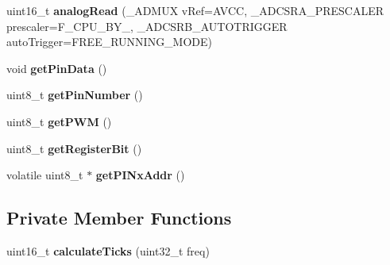 \begin{DoxyCompactItemize}
uint16\+\_\+t {\bfseries analog\+Read} (\+\_\+\+A\+D\+M\+UX v\+Ref=A\+V\+CC, \+\_\+\+A\+D\+C\+S\+R\+A\+\_\+\+P\+R\+E\+S\+C\+A\+L\+ER prescaler=F\+\_\+\+C\+P\+U\+\_\+\+B\+Y\+\_, \+\_\+\+A\+D\+C\+S\+R\+B\+\_\+\+A\+U\+T\+O\+T\+R\+I\+G\+G\+ER auto\+Trigger=F\+R\+E\+E\+\_\+\+R\+U\+N\+N\+I\+N\+G\+\_\+\+M\+O\+DE)
\item 
\mbox{\label{classPin_aa81249603376710b26f6e803db46658e}} 
void {\bfseries get\+Pin\+Data} ()
\item 
\mbox{\label{classPin_aaad2c2cc8ccda03ffe9c07e12323cf4d}} 
uint8\+\_\+t {\bfseries get\+Pin\+Number} ()
\item 
\mbox{\label{classPin_a5a9c1d0f1937b7083779ca4afba2a607}} 
uint8\+\_\+t {\bfseries get\+P\+WM} ()
\item 
\mbox{\label{classPin_af7d88df8c24769198ee8e022ce0ed0fd}} 
uint8\+\_\+t {\bfseries get\+Register\+Bit} ()
\item 
\mbox{\label{classPin_ae2d4f832b081cd2d188151a0c4589f8d}} 
volatile uint8\+\_\+t $\ast$ {\bfseries get\+P\+I\+Nx\+Addr} ()
\end{DoxyCompactItemize}
\subsection*{Private Member Functions}
\begin{DoxyCompactItemize}
\item 
\mbox{\label{classPin_a6a094c4d39ce02a525e77d1951001b53}} 
uint16\+\_\+t {\bfseries calculate\+Ticks} (uint32\+\_\+t freq)
\end{DoxyCompactItemize}
